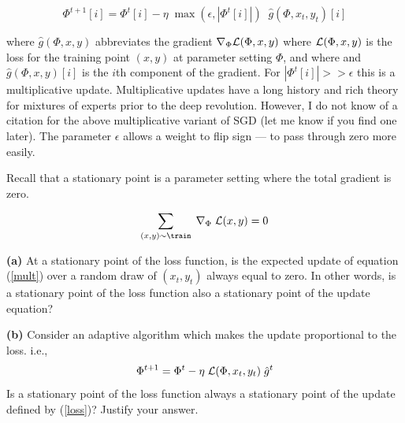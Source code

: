 \documentclass{article}
\newcommand{\solution}[1]{}
\begin{document}
\begin{equation}
  \Phi^{t+1}[i] = \Phi^t[i] - \eta \;\max(\epsilon,|\Phi^t[i]|)\;\;\hat{g}(\Phi,x_t,y_t)[i]
  \label{mult}
\end{equation}

where $\hat{g}(\Phi,x,y)$ abbreviates the gradient $\nabla_\Phi{\cal L}(\Phi,x,y)$ where ${\cal L}(\Phi,x,y)$ is the loss for the training point $(x,y)$ at parameter setting $\Phi$, and where
and $\hat{g}(\Phi,x,y)[i]$ is the $i$th component of the gradient.  For $|\Phi^t[i]| >> \epsilon$ this is a multiplicative update.
Multiplicative updates have a long history and rich theory for mixtures of experts prior to the deep revolution.  However, I do not know of a citation for
the above multiplicative variant of SGD (let me know if you find one later).  The parameter $\epsilon$ allows a weight to flip sign --- to pass through zero more easily.

Recall that a stationary point is a parameter setting where the total gradient is zero.

\begin{equation}
  \sum_{(x,y) \sim \train}\; \nabla_\Phi\;{\cal L}(x,y) = 0
  \label{stationary}
\end{equation}

\medskip
    {\bf (a)} At a stationary point of the loss function, is the expected update of equation (\ref{mult}) over a random draw of $(x_t,y_t)$ always equal to zero.  In other words, is a stationary point of the loss function
    also a stationary point of the update equation?

\solution{Yes, a stationary point of the loss function is also a stationary point of the update equation.
  \begin{eqnarray*}
    & & E_{(x,y) \sim \train} \;\;\eta\;\max(\epsilon,|\Phi^t[i]|)\;\left(\nabla_\Phi \;{\cal L}(\Phi,x,y)\right)[i]  \\
    \\
    & = & \eta\;\max(\epsilon,|\Phi[i]|)\;E_{(x,y)\sim\train} \left(\nabla_\Phi {\cal L}(\Phi,x,y)\right)[i] \\
    \\
    & = & 0
  \end{eqnarray*}
  }

\medskip
{\bf (b)} Consider an adaptive algorithm which makes the update proportional to the loss. i.e.,
\begin{equation}
  \Phi^{t+1}= \Phi^t - \eta\;{\cal L}(\Phi,x_t,y_t)\;\hat{g}^t
  \label{loss}
\end{equation}
Is a stationary point of the loss function always a stationary point of the update defined by (\ref{loss})?  Justify your answer.
\end{document}
